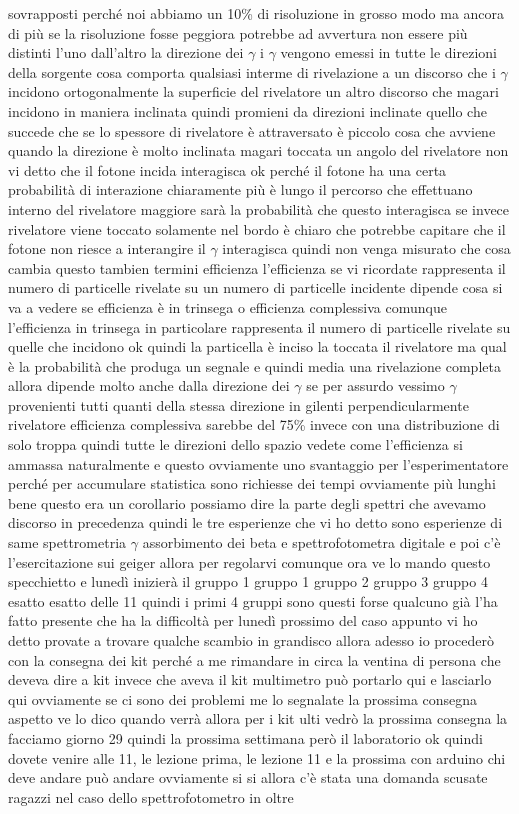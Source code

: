 {sovrapposti perché noi abbiamo un 10\% di risoluzione in grosso modo ma ancora di più se la risoluzione fosse peggiora potrebbe ad avvertura non essere più distinti l'uno dall'altro la direzione dei $\gamma$ i $\gamma$ vengono emessi in tutte le direzioni della sorgente cosa comporta qualsiasi interme di rivelazione a un discorso che i $\gamma$ incidono ortogonalmente la superficie del rivelatore un altro discorso che magari incidono in maniera inclinata quindi promieni da direzioni inclinate quello che succede che se lo spessore di rivelatore è attraversato è piccolo cosa che avviene quando la direzione è molto inclinata magari toccata un angolo del rivelatore non vi detto che il fotone incida interagisca ok perché il fotone ha una certa probabilità di interazione chiaramente più è lungo il percorso che effettuano interno del rivelatore maggiore sarà la probabilità che questo interagisca se invece rivelatore viene toccato solamente nel bordo è chiaro che potrebbe capitare che il fotone non riesce a interangire il $\gamma$ interagisca quindi non venga misurato che cosa cambia questo tambien termini efficienza l'efficienza se vi ricordate rappresenta il numero di particelle rivelate su un numero di particelle incidente dipende cosa si va a vedere se efficienza è in trinsega o efficienza complessiva comunque l'efficienza in trinsega in particolare rappresenta il numero di particelle rivelate su quelle che incidono ok quindi la particella è inciso la toccata il rivelatore ma qual è la probabilità che produga un segnale e quindi media una rivelazione completa allora dipende molto anche dalla direzione dei $\gamma$ se per assurdo vessimo $\gamma$ provenienti tutti quanti della stessa direzione in gilenti perpendicularmente rivelatore efficienza complessiva sarebbe del 75\% invece con una distribuzione di solo troppa quindi tutte le direzioni dello spazio vedete come l'efficienza si ammassa naturalmente e questo ovviamente uno svantaggio per l'esperimentatore perché per accumulare statistica sono richiesse dei tempi ovviamente più lunghi bene questo era un corollario possiamo dire la parte degli spettri che avevamo discorso in precedenza quindi le tre esperienze che vi ho detto sono esperienze di same spettrometria $\gamma$ assorbimento dei beta e spettrofotometra digitale e poi c'è l'esercitazione sui geiger allora per regolarvi comunque ora ve lo mando questo specchietto e lunedì inizierà il gruppo 1 gruppo 1 gruppo 2 gruppo 3 gruppo 4 esatto esatto delle 11 quindi i primi 4 gruppi sono questi forse qualcuno già l'ha fatto presente che ha la difficoltà per lunedì prossimo del caso appunto vi ho detto provate a trovare qualche scambio in grandisco allora adesso io procederò con la consegna dei kit perché a me rimandare in circa la ventina di persona che deveva dire a kit invece che aveva il kit multimetro può portarlo qui e lasciarlo qui ovviamente se ci sono dei problemi me lo segnalate la prossima consegna aspetto ve lo dico quando verrà allora per i kit ulti vedrò la prossima consegna la facciamo giorno 29 quindi la prossima settimana però il laboratorio ok quindi dovete venire alle 11, le lezione prima, le lezione 11 e la prossima con arduino chi deve andare può andare ovviamente si si allora c'è stata una domanda scusate ragazzi nel caso dello spettrofotometro in oltre }
